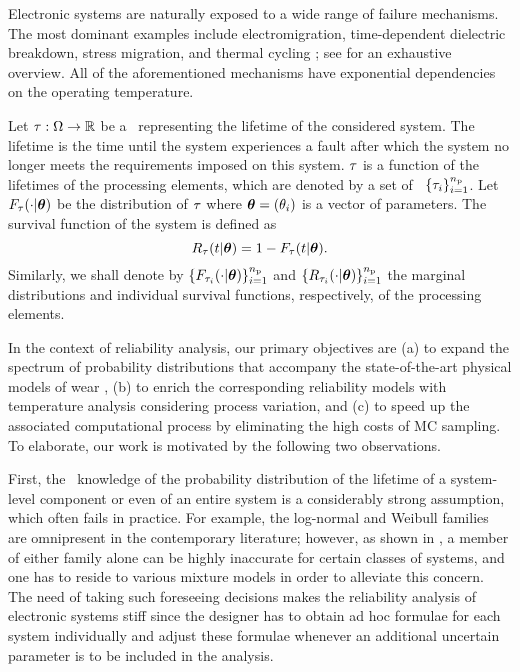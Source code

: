 Electronic systems are naturally exposed to a wide range of failure mechanisms.
The most dominant examples include electromigration, time-dependent dielectric breakdown, stress migration, and thermal cycling \cite{xiang2010}; see \cite{jedec2011} for an exhaustive overview.
All of the aforementioned mechanisms have exponential dependencies on the operating temperature.

Let $\tau: \Omega \to \mathbb{R}$ be a \rv\ representing the lifetime of the considered system.
The lifetime is the time until the system experiences a fault after which the system no longer meets the requirements imposed on this system.
$\tau$ is a function of the lifetimes of the processing elements, which are denoted by a set of \rvs\ $\{ \tau_i \}_{i = 1}^{n_\text{p}}$.
Let $F_\tau(\cdot | \bm{\theta})$ be the distribution of $\tau$ where $\bm{\theta} = (\theta_i)$ is a vector of parameters.
The survival function of the system is defined as
\[
  R_\tau(t | \bm{\theta}) = 1 - F_\tau(t | \bm{\theta}).
\]
Similarly, we shall denote by $\{ F_{\tau_i}(\cdot | \bm{\theta}) \}_{i = 1}^{n_\text{p}}$ and $\{ R_{\tau_i}(\cdot | \bm{\theta}) \}_{i = 1}^{n_\text{p}}$ the marginal distributions and individual survival functions, respectively, of the processing elements.

In the context of reliability analysis, our primary objectives are (a) to expand the spectrum of probability distributions that accompany the state-of-the-art physical models of wear \cite{jedec2011}, (b) to enrich the corresponding reliability models with temperature analysis considering process variation, and (c) to speed up the associated computational process by eliminating the high costs of MC sampling.
To elaborate, our work is motivated by the following two observations.

First, the \apriori\ knowledge of the probability distribution of the lifetime of a system-level component or even of an entire system is a considerably strong assumption, which often fails in practice.
For example, the log-normal and Weibull families are omnipresent in the contemporary literature; however, as shown in \cite{xiang2010}, a member of either family alone can be highly inaccurate for certain classes of systems,  and one has to reside to various mixture models in order to alleviate this concern.
The need of taking such foreseeing decisions makes the reliability analysis of electronic systems stiff since the designer has to obtain ad hoc formulae for each system individually and adjust these formulae whenever an additional uncertain parameter is to be included in the analysis.

